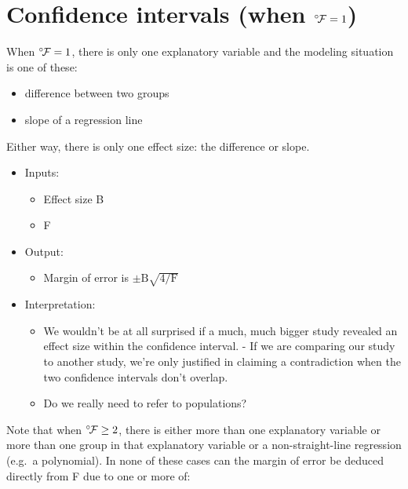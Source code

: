 \documentclass[]{book}
\providecommand{\tightlist}{%
  \setlength{\itemsep}{0pt}\setlength{\parskip}{0pt}}
\begin{document}
\hypertarget{confidence-intervals-when-circcal-f-1}{%
\section{\texorpdfstring{Confidence intervals (when \(^\circ\!{\cal F} = 1\))}{Confidence intervals (when \^{}\textbackslash{}circ\textbackslash{}!\{\textbackslash{}cal F\} = 1)}}\label{confidence-intervals-when-circcal-f-1}}

When \(^\circ\!{\cal F} = 1\), there is only one explanatory variable and the modeling situation is one of these:

\begin{itemize}
\tightlist
\item
  difference between two groups
\item
  slope of a regression line
\end{itemize}

Either way, there is only one effect size: the difference or slope.

\begin{itemize}
\tightlist
\item
  Inputs:

  \begin{itemize}
  \tightlist
  \item
    Effect size B
  \item
    F
  \end{itemize}
\item
  Output:

  \begin{itemize}
  \tightlist
  \item
    Margin of error is \(\pm \mbox{B} \sqrt{4 / \mbox{F}}\)
  \end{itemize}
\item
  Interpretation:

  \begin{itemize}
  \tightlist
  \item
    We wouldn't be at all surprised if a much, much bigger study revealed an effect size within the confidence interval. - If we are comparing our study to another study, we're only justified in claiming a contradiction when the two confidence intervals don't overlap.\\
  \item
    Do we really need to refer to populations?
  \end{itemize}
\end{itemize}

Note that when \(^\circ\!{\cal F} \geq 2\), there is either more than one explanatory variable or more than one group in that explanatory variable or a non-straight-line regression (e.g.~a polynomial). In none of these cases can the margin of error be deduced directly from F due to one or more of:
\end{document}
